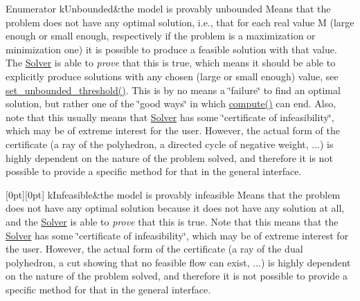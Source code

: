 \begin{DoxyEnumFields}{Enumerator}
k\+Unbounded&the model is provably unbounded Means that the problem does not have any optimal solution, i.\+e., that for each real value M (large enough or small enough, respectively if the problem is a maximization or minimization one) it is possible to produce a feasible solution with that value. The \mbox{\hyperlink{class_s_m_spp__di__unipi__it_1_1_solver}{Solver}} is able to {\itshape prove} that this is true, which means it should be able to explicitly produce solutions with any chosen (large or small enough) value, see \mbox{\hyperlink{class_s_m_spp__di__unipi__it_1_1_solver_ae1717d1363782e086aa797e7437c0352}{set\+\_\+unbounded\+\_\+threshold()}}. This is by no means a \char`\"{}failure\char`\"{} to find an optimal solution, but rather one of the \char`\"{}good ways\char`\"{} in which \mbox{\hyperlink{class_s_m_spp__di__unipi__it_1_1_solver_a504d4e3e174c7a518cc66156a8a45ce5}{compute()}} can end. Also, note that this usually means that \mbox{\hyperlink{class_s_m_spp__di__unipi__it_1_1_solver}{Solver}} has some \char`\"{}certificate of infeasibility\char`\"{}, which may be of extreme interest for the user. However, the actual form of the certificate (a ray of the polyhedron, a directed cycle of negative weight, ...) is highly dependent on the nature of the problem solved, and therefore it is not possible to provide a specific method for that in the general interface. \\
\hline

[0pt][0pt]{}\mbox{\label{class_s_m_spp__di__unipi__it_1_1_solver_a2e0367580e249e8e6018c919bee5481da7b2be7b643a4c22b61bfa3b203e6d2c6}} 
k\+Infeasible&the model is provably infeasible Means that the problem does not have any optimal solution because it does not have any solution at all, and the \mbox{\hyperlink{class_s_m_spp__di__unipi__it_1_1_solver}{Solver}} is able to {\itshape prove} that this is true. Note that this means that the \mbox{\hyperlink{class_s_m_spp__di__unipi__it_1_1_solver}{Solver}} has some \char`\"{}certificate of infeasibility\char`\"{}, which may be of extreme interest for the user. However, the actual form of the certificate (a ray of the dual polyhedron, a cut showing that no feasible flow can exist, ...) is highly dependent on the nature of the problem solved, and therefore it is not possible to provide a specific method for that in the general interface. \\
\hline


\end{DoxyEnumFields}
